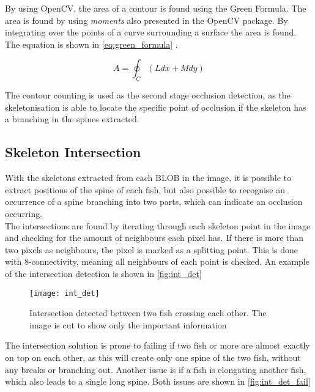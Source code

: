 By using OpenCV, the area of a contour is found using the Green Formula. The area is found by using \textit{moments} also presented in the OpenCV package. By integrating over the points of a curve  surrounding a surface the area is found. The equation is shown in \autoref{eq:green_formula} \citep{Weisstein}.

\begin{equation}\label{eq:green_formula}
	A=\oint_{C}\left(Ldx+Mdy\right)
\end{equation}

The contour counting is used as the second stage occlusion detection, as the skeletonisation is able to locate the specific point of occlusion if the skeleton has a branching in the spines extracted.

\subsection{Skeleton Intersection}
With the skeletons extracted from each BLOB in the image, it is possible to extract positions of the spine of each fish, but also possible to recognise an occurrence of a spine branching into two parts, which can indicate an occlusion occurring.\\

The intersections are found by iterating through each skeleton point in the image and checking for the amount of neighbours each pixel has. If there is more than two pixels as neighbours, the pixel is marked as a splitting point. This is done with 8-connectivity, meaning all neighbours of each point is checked. An example of the intersection detection is shown in \autoref{fig:int_det}

\begin{figure}[H]
	\centering
	\texttt{[image: int\_det]}
	\caption{Intersection detected between two fish crossing each other. The image is cut to show only the important information}
	\label{fig:int_det}
\end{figure}

The intersection solution is prone to failing if two fish or more are almost exactly on top on each other, as this will create only one spine of the two fish, without any breaks or branching out. Another issue is if a fish is elongating another fish, which also leads to a single long spine. Both issues are shown in \autoref{fig:int_det_fail}


